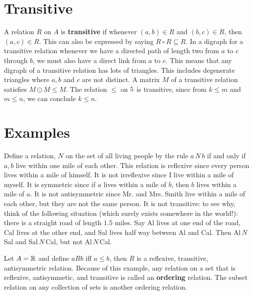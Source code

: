\section{Transitive} 
A relation $R$ on $A$ is {\bfseries transitive} if  whenever $(a,b)\in R$ and $(b,c)\in R$, then
$(a,c)\in R$. This can also be expressed by saying $R\circ R\subseteq R$. 
In a digraph for a transitive relation whenever we have a directed path of
 length two
from $a$ to $c$ through $b$, we must also have a direct link from $a$ to $c$. This means
 that any
digraph of a transitive relation has lots of triangles. This includes degenerate triangles
 where
$a, b$ and $c$ are not distinct. A matrix $M$ of a transitive relation satisfies 
$M\odot M\leq M$. 
The relation $\leq$ on $5$ is transitive, since from $k\leq m$ and $m\leq n$, we can 
conclude $k\leq n$. 

\section{Examples}
\begin{exmp}
 \item Define a relation, $N$ on the set of all living people by the rule
 $a\,N\,b$ if and only if $a, b$ live within one mile of each other.
 This relation is reflexive since every person lives within a mile of himself.
 It is not irreflexive since I live within a mile of myself.
 It is  symmetric since if $a$ lives within a mile of $b$, then $b$ lives within
 a mile of $a$. It is not antisymmetric since Mr{.} and Mrs{.} Smith live within
 a mile of each other, but they are not the same person. It is not transitive:
 to see why, think of the following situation (which surely exists somewhere 
 in the world!): there is a straight road of length $1.5$ miles. Say Al lives
 at one end of the road, Cal lives at the other end, and Sal lives half way between
 Al and Cal. Then Al$\,N\,$Sal and Sal$\,N\,$Cal, but not Al$\,N\,$Cal. 
\end{exmp}
 
\begin{exmp}
 Let $A=\mathbb{R}$ and define $aRb$ iff $a\leq b$, then $R$ is a reflexive, 
 transitive, antisymmetric relation. Because of this example, any relation
 on a set that is reflexive, antisymmetic, and transitive is called an 
 {\bfseries ordering} relation. The subset relation on any collection of sets
 is another ordering relation.
\end{exmp}
 
